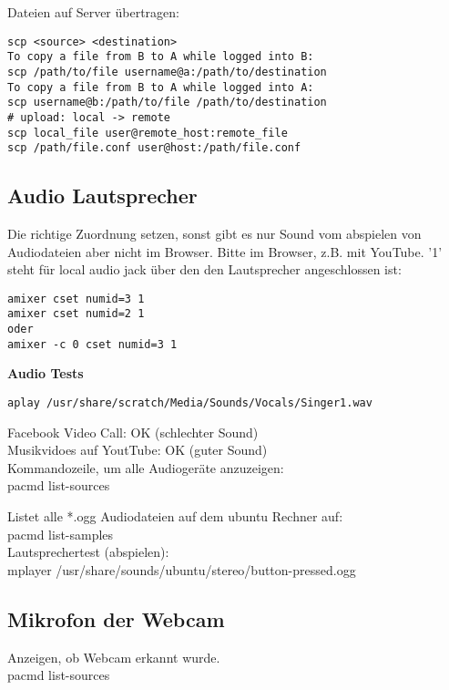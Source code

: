 Dateien auf Server übertragen:
\begin{verbatim}
scp <source> <destination>
To copy a file from B to A while logged into B:
scp /path/to/file username@a:/path/to/destination
To copy a file from B to A while logged into A:
scp username@b:/path/to/file /path/to/destination
# upload: local -> remote
scp local_file user@remote_host:remote_file
scp /path/file.conf user@host:/path/file.conf
\end{verbatim}


\subsection{Audio Lautsprecher}

Die richtige Zuordnung setzen, sonst gibt es nur Sound vom 
abspielen von Audiodateien aber nicht im Browser. Bitte im 
Browser, z.B. mit YouTube. '1' steht für local audio jack über 
den den Lautsprecher angeschlossen ist:
\begin{verbatim}
amixer cset numid=3 1
amixer cset numid=2 1
oder
amixer -c 0 cset numid=3 1
\end{verbatim}

\textbf{Audio Tests}
\begin{verbatim}aplay /usr/share/scratch/Media/Sounds/Vocals/Singer1.wav\end{verbatim}
Facebook Video Call: OK (schlechter Sound)\\
Musikvidoes auf YoutTube: OK (guter Sound)\\

Kommandozeile, um alle Audiogeräte anzuzeigen:\\
pacmd list-sources

Listet alle *.ogg Audiodateien auf dem ubuntu Rechner auf:\\
pacmd list-samples\\
Lautsprechertest (abspielen):\\
mplayer /usr/share/sounds/ubuntu/stereo/button-pressed.ogg 

\subsection{Mikrofon der Webcam}
Anzeigen, ob Webcam erkannt wurde.\\
pacmd list-sources\\ 

